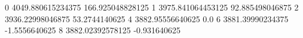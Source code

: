 0 4049.880615234375 166.925048828125
1 3975.841064453125 92.885498046875
2 3936.22998046875 53.2744140625
4 3882.95556640625 0.0
6 3881.39990234375 -1.5556640625
8 3882.02392578125 -0.931640625
